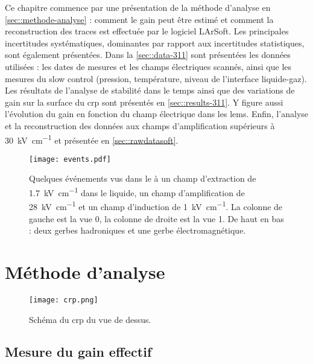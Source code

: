     Ce chapitre commence par une présentation de la méthode d'analyse en \autoref{sec::methode-analyse} : comment le gain peut être estimé et comment la reconstruction des traces est effectuée par le logiciel LArSoft. Les principales incertitudes systématiques, dominantes par rapport aux incertitudes statistiques, sont également présentées. Dans la \autoref{sec::data-311} sont présentées les données utilisées : les dates de mesures et les champs électriques scannés, ainsi que les mesures du slow control (pression, température, niveau de l'interface liquide-gaz). Les résultats de l'analyse de stabilité dans le temps ainsi que des variations de gain sur la surface du \gls{crp} sont présentés en \autoref{sec::results-311}. Y figure aussi l'évolution du gain en fonction du champ électrique dans les \glspl{lem}. Enfin, l'analyse et la reconstruction des données aux champs d'amplification supérieurs à \SI{30}{\kilo\volt\per\centi\meter} et présentée en \autoref{sec::rawdatasoft}.

    \begin{figure}[htpb]
      \centering
      \texttt{[image: events.pdf]}
      \caption[Quelques événements vus dans le \TOO{}]{\label{fig::data-sample}Quelques événements vus dans le \TOO{} à un champ d'extraction de \SI{1.7}{\kilo\volt\per\centi\meter} dans le liquide, un champ d'amplification de \SI{28}{\kilo\volt\per\centi\meter} et un champ d'induction de \SI{1}{\kilo\volt\per\centi\meter}. La colonne de gauche est la vue 0, la colonne de droite est la vue 1. De haut en bas : deux gerbes hadroniques et une gerbe électromagnétique.}
    \end{figure}
  
  \section{Méthode d'analyse}\label{sec::methode-analyse}

    \begin{figure}[htpb]
      \centering
      \texttt{[image: crp.png]}
      \caption[Schéma du CRP du \TOO{} vue de dessus]{\label{fig::crp-chap5}Schéma du \gls{crp} du \TOO{} vue de dessus.}
    \end{figure}

    \subsection{Mesure du gain effectif}

